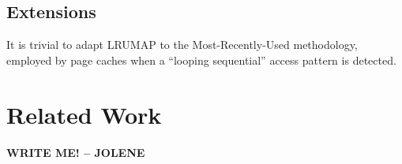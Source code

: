 \documentclass[letterpaper,10pt]{article}
\begin{document}
\begin{multicols}{2}
\subsection{Extensions}
It is trivial to adapt LRUMAP to the Most-Recently-Used methodology, employed
by page caches when a ``looping sequential''\cite{dewitt} access pattern is
detected.
\section{Related Work}
\textbf{WRITE ME! -- JOLENE}


\end{multicols}
\end{document}
